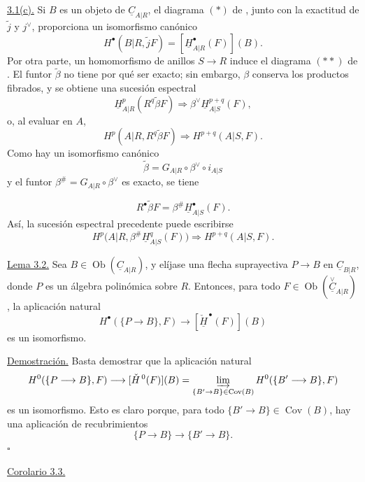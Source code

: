 \par\medskip\noindent
\underline{3.1(c).} Si $B$ es un objeto de
$\underline C_{A|R}$, el diagrama $(*)$ de , junto con la
exactitud de $\widetilde j$ y $j^{\vee}$, proporciona un isomorfismo
canónico
\[
 H^{\bullet}(B|R,\widetilde jF)=
 [\underline H^{\bullet}_{A|R}(F)](B).
\]
Por otra parte, un homomorfismo de anillos $S\longrightarrow R$ induce el
diagrama $(**)$ de . El funtor $\widetilde\beta$ no tiene por qué
ser exacto; sin embargo, $\beta$ conserva los productos fibrados, y se
obtiene una sucesión espectral
\[
 \underline H^p_{A|R}(R^q\widetilde\beta F)
 \Longrightarrow
 \beta^{\vee}\underline H^{p+q}_{A|S}(F),
\]
o, al evaluar en $A$,
\[
 H^p(A|R,R^q\widetilde\beta F)
 \Longrightarrow H^{p+q}(A|S,F).
\]
Como hay un isomorfismo canónico
\[
 \widetilde\beta=
 G_{A|R}\circ\beta^{\vee}\circ i_{A|S}
\]
y el funtor
$\beta^{\#}=G_{A|R}\circ\beta^{\vee}$ es exacto, se tiene


\[
 R^{\bullet}\widetilde\beta F=
 \beta^{\#}\underline H^{\bullet}_{A|S}(F).
\]
Así, la sucesión espectral precedente puede escribirse
\[
 H^p\bigl(A|R,\beta^{\#}\underline H^q_{A|S}(F)\bigr)
 \Longrightarrow H^{p+q}(A|S,F).
\]

\underline{Lema 3.2.} Sea
$B\in\operatorname{Ob}(\underline C_{A|R})$, y elíjase una flecha
suprayectiva $P\longrightarrow B$ en $\underline C_{B|R}$, donde $P$ es
un álgebra polinómica sobre $R$. Entonces, para todo
$F\in\operatorname{Ob}(\overset{\vee}{\underline C}_{A|R})$, la
aplicación natural
\[
 H^{\bullet}(\{P\longrightarrow B\},F)
 \longrightarrow[\check{\underline H}^{\,\bullet}(F)](B)
\]
es un isomorfismo.

\underline{Demostración.} Basta demostrar que la aplicación natural
\[
 H^0(\{P\longrightarrow B\},F)
 \longrightarrow[\check{\underline H}^{\,0}(F)](B)
 =\varinjlim_{\{B'\to B\}\in\operatorname{Cov}(B)}
   H^0(\{B'\longrightarrow B\},F)
\]
es un isomorfismo. Esto es claro porque, para todo
$\{B'\longrightarrow B\}\in\operatorname{Cov}(B)$, hay una aplicación
de recubrimientos
\[
 \{P\longrightarrow B\}\longrightarrow
 \{B'\longrightarrow B\}.
\]
\hfill$\square$

\underline{Corolario 3.3.}

